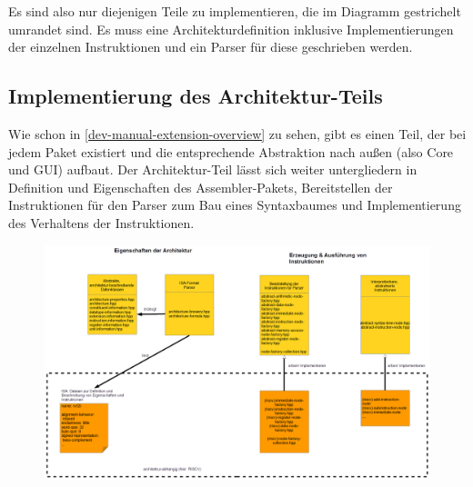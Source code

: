 Es sind also nur diejenigen Teile zu implementieren, die im Diagramm gestrichelt umrandet sind. Es muss eine Architekturdefinition inklusive Implementierungen der einzelnen Instruktionen und ein Parser für diese geschrieben werden.

\subsection{Implementierung des Architektur-Teils}
Wie schon in \autoref{dev-manual-extension-overview} zu sehen, gibt es einen Teil, der bei jedem Paket existiert und die entsprechende Abstraktion nach außen (also Core und GUI) aufbaut. Der Architektur-Teil lässt sich weiter untergliedern in Definition und Eigenschaften des Assembler-Pakets, Bereitstellen der Instruktionen für den Parser zum Bau eines Syntaxbaumes und Implementierung des Verhaltens der Instruktionen.
\begin{figure}[ht]
	\centering
	\includegraphics[scale=0.45]{charts/extension-arch.png}
\end{figure}

